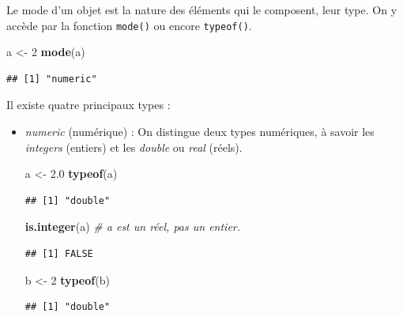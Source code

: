 \documentclass[
  11pt,
]{book}
\newenvironment{Shaded}{\begin{snugshade}}{\end{snugshade}}
\newcommand{\CommentTok}[1]{\textcolor[rgb]{0.56,0.35,0.01}{\textit{#1}}}
\newcommand{\DecValTok}[1]{\textcolor[rgb]{0.00,0.00,0.81}{#1}}
\newcommand{\FloatTok}[1]{\textcolor[rgb]{0.00,0.00,0.81}{#1}}
\newcommand{\KeywordTok}[1]{\textcolor[rgb]{0.13,0.29,0.53}{\textbf{#1}}}
\newcommand{\NormalTok}[1]{#1}
\newcommand{\StringTok}[1]{\textcolor[rgb]{0.31,0.60,0.02}{#1}}
\numberwithin{equation}{section}
\numberwithin{countremarque}{section}
\begin{document}
Le mode d'un objet est la nature des éléments qui le composent, leur type. On y accède par la fonction \texttt{mode()} ou encore \texttt{typeof()}.

\begin{Shaded}
\begin{Highlighting}[]
\NormalTok{a \textless{}{-}}\StringTok{ }\DecValTok{2}
\KeywordTok{mode}\NormalTok{(a)}
\end{Highlighting}
\end{Shaded}

\begin{lstlisting}
## [1] "numeric"
\end{lstlisting}

Il existe quatre principaux types :

\begin{itemize}
\item
  \emph{numeric} (numérique) :
  On distingue deux types numériques, à savoir les \emph{integers} (entiers) et les \emph{double} ou \emph{real} (réels).

\begin{Shaded}
\begin{Highlighting}[]
\NormalTok{a \textless{}{-}}\StringTok{ }\FloatTok{2.0}
\KeywordTok{typeof}\NormalTok{(a)}
\end{Highlighting}
\end{Shaded}

\begin{lstlisting}
## [1] "double"
\end{lstlisting}

\begin{Shaded}
\begin{Highlighting}[]
\KeywordTok{is.integer}\NormalTok{(a) }\CommentTok{\# a est un réel, pas un entier.}
\end{Highlighting}
\end{Shaded}

\begin{lstlisting}
## [1] FALSE
\end{lstlisting}

\begin{Shaded}
\begin{Highlighting}[]
\NormalTok{b \textless{}{-}}\StringTok{ }\DecValTok{2}
\KeywordTok{typeof}\NormalTok{(b)}
\end{Highlighting}
\end{Shaded}

\begin{lstlisting}
## [1] "double"
\end{lstlisting}


\end{itemize}
\end{document}
